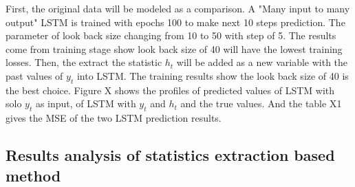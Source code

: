 First, the original data will be modeled as a comparison. A "Many input to many output" LSTM is trained with epochs 100 to make next 10 steps prediction. The parameter of look back size changing from 10 to 50 with step of 5. The results come from training stage show look back size of 40 will have the lowest training losses. Then, the extract the statistic $h_t$ will be added as a new variable with the past values of $y_t$ into LSTM. The training results show the look back size of 40 is the best choice. Figure X shows the  profiles of predicted values of LSTM with solo $y_t$ as input, of LSTM with $y_t$ and $h_t$ and the true values. And the table X1 gives the MSE of the two LSTM prediction results. 


\subsection{Results analysis of statistics extraction based method}



































